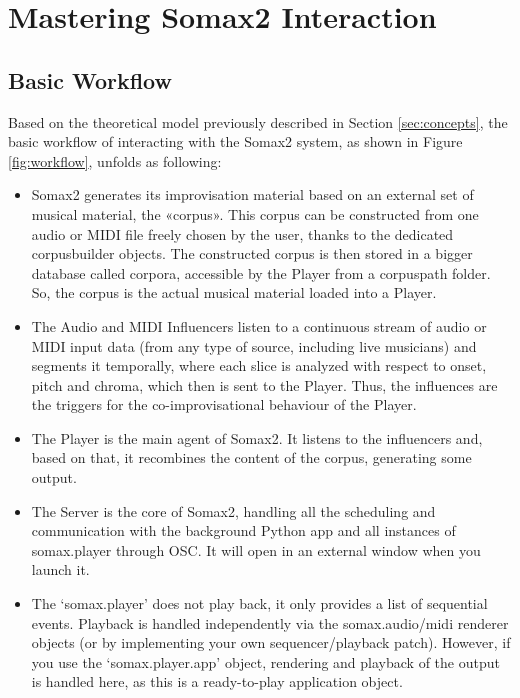 \chapter{Mastering Somax2 Interaction}\label{sec:interaction}

\section{Basic Workflow}

Based on the theoretical model previously described in Section \ref{sec:concepts}, the basic workflow of interacting with the Somax2 system, as shown in Figure \ref{fig:workflow}, unfolds as following:

\begin{itemize}
    \item Somax2 generates its improvisation material based on an external set of musical material, the «corpus». This corpus can be constructed from one audio or MIDI file freely chosen by the user, thanks to the dedicated corpusbuilder objects. The constructed corpus is then stored in a bigger database called corpora, accessible by the Player from a corpuspath folder. So, the corpus is the actual musical material loaded into a Player.
    \item The Audio and MIDI Influencers listen to a continuous stream of audio or MIDI input data (from any type of source, including live musicians) and segments it temporally, where each slice is analyzed with respect to onset, pitch and chroma, which then is sent to the Player. Thus, the influences are the triggers for the co-improvisational behaviour of the Player.
    \item The Player is the main agent of Somax2. It listens to the influencers and, based on that, it recombines the content of the corpus, generating some output.
    \item The Server is the core of Somax2, handling all the scheduling and communication with the background Python app and all instances of somax.player through OSC. It will open in an external window when you launch it.
    \item The `somax.player' does not play back, it only provides a list of sequential events. Playback is handled independently via the somax.audio/midi renderer objects (or by implementing your own sequencer/playback patch). However, if you use the `somax.player.app' object, rendering and playback of the output is handled here, as this is a ready-to-play application object.

\end{itemize}

